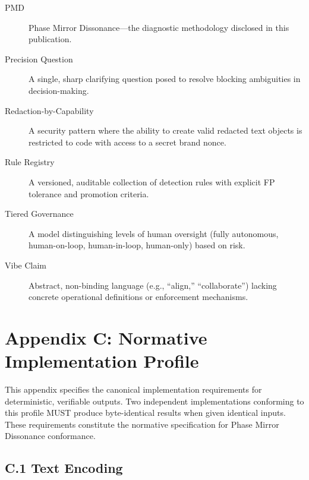 \documentclass[11pt,a4paper]{article}
\begin{document}
\begin{description}
\item[PMD] Phase Mirror Dissonance—the diagnostic methodology disclosed in this publication.

\item[Precision Question] A single, sharp clarifying question posed to resolve blocking ambiguities in decision-making.

\item[Redaction-by-Capability] A security pattern where the ability to create valid redacted text objects is restricted to code with access to a secret brand nonce.

\item[Rule Registry] A versioned, auditable collection of detection rules with explicit FP tolerance and promotion criteria.

\item[Tiered Governance] A model distinguishing levels of human oversight (fully autonomous, human-on-loop, human-in-loop, human-only) based on risk.

\item[Vibe Claim] Abstract, non-binding language (e.g., ``align,'' ``collaborate'') lacking concrete operational definitions or enforcement mechanisms.
\end{description}

\section*{Appendix C: Normative Implementation Profile}

This appendix specifies the canonical implementation requirements for deterministic, verifiable outputs. Two independent implementations conforming to this profile MUST produce byte-identical results when given identical inputs. These requirements constitute the normative specification for Phase Mirror Dissonance conformance.

\subsection*{C.1 Text Encoding}
\end{document}
